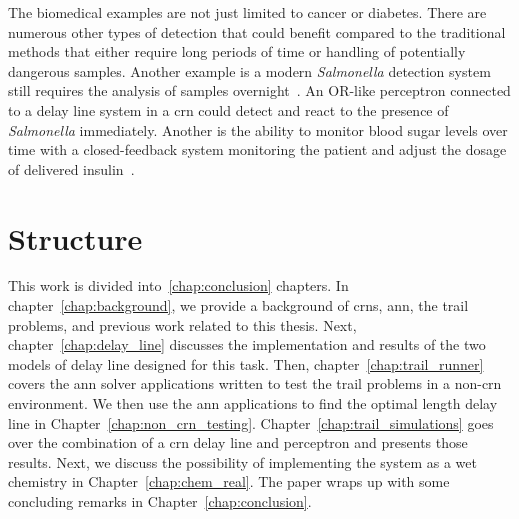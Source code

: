 The biomedical examples are not just limited to cancer or diabetes. There are numerous other types of detection that could benefit compared to the traditional methods that either require long periods of time or handling of potentially dangerous samples. Another example is a modern \textit{Salmonella} detection system still requires the analysis of samples overnight~\cite{Alvarez2004-ix}. An OR-like perceptron connected to a delay line system in a \gls{crn} could detect and react to the presence of \textit{Salmonella} immediately. Another is the ability to monitor blood sugar levels over time with a closed-feedback system monitoring the patient and adjust the dosage of delivered insulin~\cite{Wang2010-se}.

\section{Structure}
This work is divided into~\ref*{chap:conclusion} chapters. In chapter~\ref{chap:background}, we provide a background of \glspl{crn}, \gls{ann}, the trail problems, and previous work related to this thesis. Next, chapter~\ref{chap:delay_line} discusses the implementation and results of the two models of delay line designed for this task. Then, chapter~\ref{chap:trail_runner} covers the \gls{ann} solver applications written to test the trail problems in a non-\gls{crn} environment. We then use the \gls{ann} applications to find the optimal length delay line in Chapter~\ref{chap:non_crn_testing}. Chapter~\ref{chap:trail_simulations} goes over the combination of a \gls{crn} delay line and perceptron and presents those results. Next, we discuss the possibility of implementing the system as a wet chemistry in Chapter~\ref{chap:chem_real}. The paper wraps up with some concluding remarks in Chapter~\ref{chap:conclusion}.
